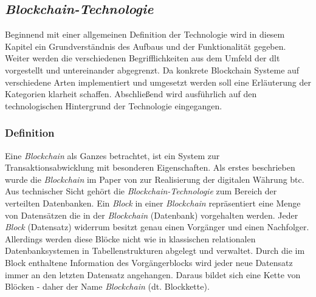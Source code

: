\subsection{\textit{Blockchain-Technologie}}
Beginnend mit einer allgemeinen Definition der Technologie wird in diesem Kapitel ein Grundverständnis des Aufbaus und der Funktionalität gegeben. Weiter werden die verschiedenen Begrifflichkeiten aus dem Umfeld der \acf{dlt} vorgestellt und untereinander abgegrenzt. Da konkrete Blockchain Systeme auf verschiedene Arten implementiert und umgesetzt werden soll eine Erläuterung der Kategorien klarheit schaffen. Abschließend wird ausführlich auf den technologischen Hintergrund der Technologie eingegangen.

\subsubsection{Definition} \label{blockchain-definition}
Eine \textit{Blockchain} als Ganzes betrachtet, ist ein System zur Transaktionsabwicklung mit besonderen Eigenschaften. Als erstes beschrieben wurde die \textit{Blockchain} im Paper von \cite{Nakamoto2009} zur Realisierung der digitalen Währung \ac{btc}. Aus technischer Sicht gehört die \textit{Blockchain-Technologie} zum Bereich der verteilten Datenbanken. Ein \textit{Block} in einer \textit{Blockchain} repräsentiert eine Menge von Datensätzen die in der \textit{Blockchain} (Datenbank) vorgehalten werden. Jeder \textit{Block} (Datensatz) widerrum besitzt genau einen Vorgänger und einen Nachfolger. Allerdings werden diese Blöcke nicht wie in klassischen relationalen Datenbanksystemen in Tabellenstrukturen abgelegt und verwaltet. Durch die im Block enthaltene Information des Vorgängerblocks wird jeder neue Datensatz immer an den letzten Datensatz angehangen. Daraus bildet sich eine Kette von Blöcken - daher der Name \textit{Blockchain} (dt. Blockkette).

